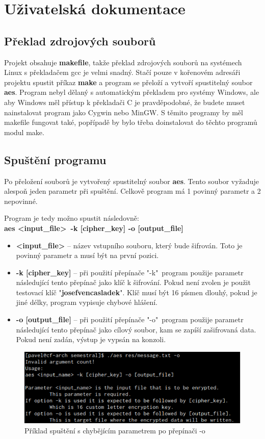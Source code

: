 \documentclass[12pt]{article}
\begin{document}
\section{Uživatelská dokumentace}
\subsection{Překlad zdrojových souborů}
Projekt obsahuje \textbf{makefile}, takže překlad zdrojových souborů na
systémech Linux s překladačem gcc je velmi snadný. Stačí pouze v kořenovém
adresáři projektu spustit příkaz \textbf{make} a program se přeloží a
vytvoří spustitelný soubor
\textbf{aes}. Program nebyl dělaný s automatickým překladem pro systémy Windows, ale
aby Windows měl přístup k překladači C je pravděpodobné, že budete muset nainstalovat
program jako Cygwin nebo MinGW. S těmito programy by měl makefile fungovat také, 
popřípadě by bylo třeba doinstalovat do těchto programů modul make.
\subsection{Spuštění programu}
Po přeložení souborů je vytvořený spustitelný soubor \textbf{aes}. Tento soubor 
vyžaduje alespoň jeden parametr při spuštění. Celkově program má 1 povinný
parametr a 2 nepovinné.

Program je tedy možno spustit následovně:\\
\textbf{aes \textless input\_file\textgreater\ -k [cipher\_key] -o [output\_file]}\\
\begin{itemize}
	\item \textbf{\textless input\_file\textgreater} -- název vstupního souboru,
		který bude šifrován. Toto je povinný parametr a musí být na první
		pozici.
	\item \textbf{-k [cipher\_key]} -- při použití přepínače "-k"\ 
		program použije parametr následující tento přepínač jako klíč k 
		šifrování. Pokud není zvolen je použit
		testovací klíč "\textbf{josefvencasladek}". Klíč musí být 16
		písmen dlouhý, pokud je jiné délky, program vypisuje chybové
		hlášení.
	\item \textbf{-o [output\_file]} -- při použití přepínače "-o"\ 
		program použije parametr následující tento přepínač jako
		cílový soubor, kam se zapíší zašifrovaná
		data. Pokud není zadán, výstup je vypsán na konzoli.
\end{itemize}
\begin{figure} [ht]
	\centering
	\includegraphics[width=\textwidth]{img/aes_arg_err.pdf}
	\caption{Příklad spuštění s chybějícím parametrem po přepínači -o}
	\label{fig:aes_arg_err}
\end{figure}
%
%
\end{document}

